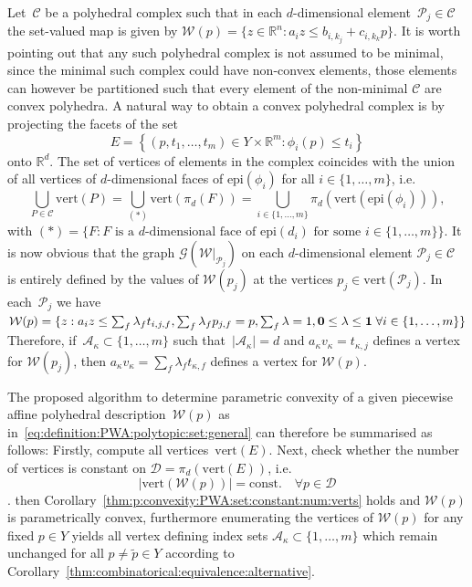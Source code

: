 \documentclass[final]{elsarticle}
\providecommand{\abs}[1]{\left|#1\right|}
\providecommand{\epi}{\text{epi}}
\theoremstyle{remark}
\theoremstyle{definition}
\begin{document}
Let~$\mathcal C$ be a polyhedral complex such that in each $d$-dimensional element~$\mathcal P_j\in\mathcal C$ the set-valued map is given by $\mathcal W(p) = \{z\in\mathbb R^n:a_i z\leq b_{i,k_j} + c_{i,k_k} p\}$. 
%
It is worth pointing out that any such polyhedral complex is not assumed to be minimal, since the minimal such complex could have non-convex elements, those elements can however be partitioned such that every element of the non-minimal $\mathcal C$ are convex polyhedra. 
%
A natural way to obtain a convex polyhedral complex is by projecting the facets of the set
%
\begin{equation}
  E=\left\{(p,t_1,\dots,t_m)\in Y\times\mathbb R^{m}:\phi_i(p)\leq t_i\right\}
\end{equation}
%
onto $\mathbb R^d$.
%
The set of vertices of elements in the complex coincides with the union of all vertices of $d$-dimensional faces of $\epi(\phi_i)$ for all $i\in\{1,\dots,m\}$, i.e.
%
$$
	\bigcup_{P\in\mathcal C}\text{vert}(P) = \bigcup_{(\ast)} \text{vert}(\pi_d(F)) = \bigcup_{i\in\{1,\dots,m\}}\pi_d(\text{vert}(\epi(\phi_i))),
$$
%
with $(\ast) = \{F: F \text{ is a } d\text{-dimensional face of } \epi(d_i) \text{ for some } i\in\{1,\dots,m\}\}$.
%
It is now obvious that the graph $\mathscr G(\mathcal W\vert_{\mathcal P_j})$ on each $d$-dimensional element $\mathcal P_j\in\mathcal C$ is entirely defined by the values of $\mathcal W(p_j)$ at the vertices $p_j\in\text{vert}(\mathcal P_j)$.
%
In each~$\mathcal P_j$ we have $\mathcal W(p) = \{z: a_i z\leq \sum_f \lambda_f t_{i,j,f}, \sum_f\lambda_f p_{j,f}=p, \sum_f\lambda=1,{\bf{0}}\leq\lambda\leq{\bf{1}}\; \forall i\in\{1,\dots,m\}\}$
%
Therefore, if~$\mathcal A_\kappa\subset\{1,\dots,m\}$ such that~$\abs{\mathcal A_\kappa}=d$ and $a_\kappa v_\kappa = t_{\kappa,j}$ defines a vertex for $\mathcal W(p_j)$, then $a_\kappa v_\kappa = \sum_f \lambda_f t_{\kappa,f}$ defines a vertex for $\mathcal W(p)$.

The proposed algorithm to determine parametric convexity of a given piecewise affine polyhedral description~$\mathcal W(p)$ as in~\eqref{eq:definition:PWA:polytopic:set:general} can therefore be summarised as follows:
%
Firstly, compute all vertices~$\text{vert}(E)$.
%
Next, check whether the number of vertices is constant on $\mathcal D = \pi_d\left(\text{vert}(E)\right)$, i.e. 
%
$$\abs{\text{vert}(\mathcal W(p))} = \text{const.}\quad \forall p\in\mathcal D$$.
%
then Corollary~\ref{thm:p:convexity:PWA:set:constant:num:verts} holds and $\mathcal W(p)$ is parametrically convex, furthermore enumerating the vertices of $\mathcal W(p)$ for any fixed $p\in Y$ yields all vertex defining index sets $\mathcal A_\kappa\subset\{1,\dots,m\}$ which remain unchanged for all $p\neq\tilde p\in Y$ according to Corollary~\ref{thm:combinatorical:equivalence:alternative}.
%
\end{document}
